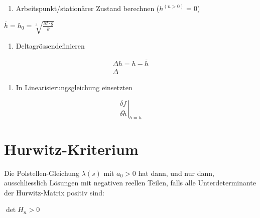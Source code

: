 \documentclass[
  10pt,
  a4paper,
]{article}
\providecommand{\tightlist}{%
  \setlength{\itemsep}{0pt}\setlength{\parskip}{0pt}}\usepackage{longtable,booktabs,array}
\numberwithin{equation}{section}
\begin{document}
\begin{multicols}{2}
\begin{tcolorbox}
\begin{enumerate}
\def\labelenumi{\arabic{enumi}.}
\setcounter{enumi}{1}
\tightlist
\item
  Arbeitspunkt/stationärer Zustand berechnen (\(h^{(n>0)}=0\))
\end{enumerate}

\(\overline{h}=h_0=\sqrt[3]{\frac{M\cdot g}{k}}\)

\begin{enumerate}
\def\labelenumi{\arabic{enumi}.}
\setcounter{enumi}{2}
\tightlist
\item
  Deltagrössendefinieren
\end{enumerate}

\[
\begin{array}{l}
\Delta h = h-\overline{h} \\
\Delta 
\end{array}
\]

\begin{enumerate}
\def\labelenumi{\arabic{enumi}.}
\setcounter{enumi}{2}
\tightlist
\item
  In Linearisierungsgleichung einsetzten
\end{enumerate}

\[
\left.\frac{\delta f}{\delta \ddot{h}}\right\rvert_{h=\overline{h}}
\]

\end{tcolorbox}

\hypertarget{hurwitz-kriterium}{%
\section{Hurwitz-Kriterium}\label{hurwitz-kriterium}}

\begin{tcolorbox}[enhanced jigsaw, coltitle=black, arc=.35mm, breakable, opacityback=0, opacitybacktitle=0.6, rightrule=.15mm, titlerule=0mm, bottomrule=.15mm, leftrule=.75mm, bottomtitle=1mm, colframe=quarto-callout-important-color-frame, toprule=.15mm, colbacktitle=quarto-callout-important-color!10!white, toptitle=1mm, title=\textcolor{quarto-callout-important-color}{\faExclamation}\hspace{0.5em}{Hurwitz-Kriterium}, left=2mm, colback=white]

Die Polstellen-Gleichung \(\lambda(s)\) mit \(a_0>0\) hat dann, und nur
dann, ausschliesslich Lösungen mit negativen reellen Teilen, falls alle
Unterdeterminante der Hurwitz-Matrix positiv sind:

\(\det H_n > 0\)


\end{tcolorbox}
\end{multicols}
\end{document}
